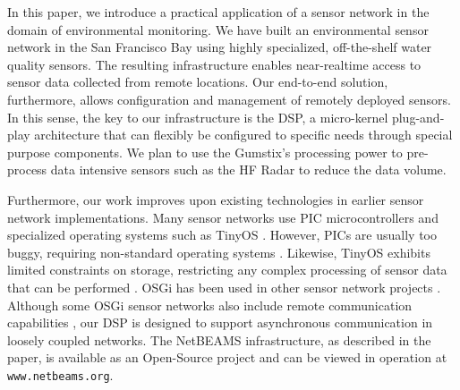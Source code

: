 \documentclass[conference]{IEEEtran}
\begin{document}

In this paper, we introduce a practical application of a sensor network
in the domain of environmental monitoring. We have built an
environmental sensor network in the San Francisco Bay using highly
specialized, off-the-shelf water quality sensors. The resulting
infrastructure enables near-realtime access to sensor data collected
from remote locations. Our end-to-end solution, furthermore, allows
configuration and management of remotely deployed sensors. In this sense, the
key to our infrastructure is the DSP, a micro-kernel plug-and-play
architecture that can flexibly be configured to specific needs through
special purpose components. We plan to use the Gumstix's processing
power to pre-process data intensive sensors such as the HF Radar to
reduce the data volume.


Furthermore, our work improves upon existing technologies in earlier sensor network implementations.
Many sensor networks use PIC microcontrollers \cite{Pic01} and specialized operating systems
such as TinyOS \cite{tinyos01}. However, PICs are usually too buggy,
requiring non-standard operating systems \cite{Martinez04}. Likewise, TinyOS exhibits limited 
constraints on storage, restricting any complex processing of sensor data
that can be performed \cite{Martinez04}. OSGi has been used in other sensor network
projects \cite{Mueller07, Baude07}. Although some OSGi sensor networks also include remote 
communication capabilities \cite{Rellermeyer}, our DSP is designed to support asynchronous 
communication in loosely coupled networks. The NetBEAMS infrastructure, as
described in the paper, is available as an Open-Source project and can be 
viewed in operation at \texttt{www.netbeams.org}.





\end{document}
